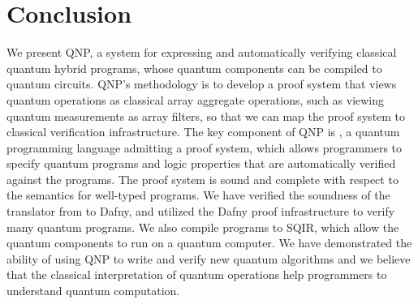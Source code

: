 \section{Conclusion}

We present QNP, a system for expressing and automatically verifying classical quantum hybrid programs, whose quantum components can be compiled to quantum circuits. QNP's methodology is to develop a proof system that views quantum operations as classical array aggregate operations, such as viewing quantum measurements as array filters, so that we can map the proof system to classical verification infrastructure. 
The key component of QNP is \qafny, a quantum programming language admitting a proof system, which allows programmers to specify quantum programs and logic properties that are automatically verified against the programs.
The \qafny proof system is sound and complete with respect to the \qafny semantics for well-typed \qafny programs. 
We have verified the soundness of the translator from \qafny to Dafny, and utilized the Dafny proof infrastructure to verify many quantum programs. We also compile \qafny programs to SQIR, which allow the quantum components to run on a quantum computer.
We have demonstrated the ability of using QNP to write and verify new quantum algorithms and we believe that the classical interpretation of quantum operations help programmers to understand quantum computation. 
